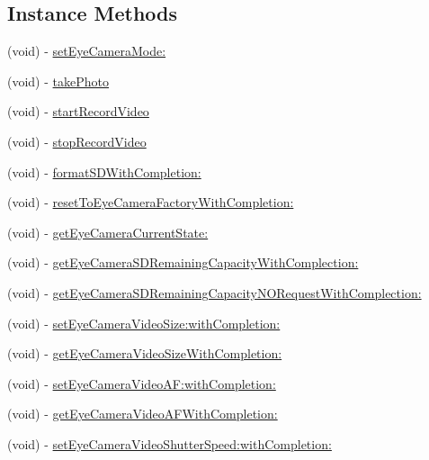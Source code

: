 \subsection*{Instance Methods}
\begin{DoxyCompactItemize}
\item 
(void) -\/ \hyperlink{interface_p_v_eye_camera_aeb9dbca0f5efc52162ffa13365040f8d}{set\+Eye\+Camera\+Mode\+:}
\item 
(void) -\/ \hyperlink{interface_p_v_eye_camera_aeb99a8e6bc9f5a0e7a183305cc39b7fb}{take\+Photo}
\item 
(void) -\/ \hyperlink{interface_p_v_eye_camera_a1fc31e8a6aab22625c780b1ecaff5e87}{start\+Record\+Video}
\item 
(void) -\/ \hyperlink{interface_p_v_eye_camera_a9b0113dbfb0790217f840d8c633e694e}{stop\+Record\+Video}
\item 
(void) -\/ \hyperlink{interface_p_v_eye_camera_aa944cc721867320c4c015eb7da0f8369}{format\+S\+D\+With\+Completion\+:}
\item 
(void) -\/ \hyperlink{interface_p_v_eye_camera_a6e9ae0dd101cddb8cca78c88bac7149b}{reset\+To\+Eye\+Camera\+Factory\+With\+Completion\+:}
\item 
(void) -\/ \hyperlink{interface_p_v_eye_camera_a7f2b3144f0e9aa5757d07d8df99a7998}{get\+Eye\+Camera\+Current\+State\+:}
\item 
(void) -\/ \hyperlink{interface_p_v_eye_camera_a9cac9e6fab67c4da6ad1f42571ab7002}{get\+Eye\+Camera\+S\+D\+Remaining\+Capacity\+With\+Complection\+:}
\item 
(void) -\/ \hyperlink{interface_p_v_eye_camera_a303f6825fa1f885bca11298989637eaf}{get\+Eye\+Camera\+S\+D\+Remaining\+Capacity\+N\+O\+Request\+With\+Complection\+:}
\item 
(void) -\/ \hyperlink{interface_p_v_eye_camera_abe2afddccc2b07d02cd6b2153b04d3a4}{set\+Eye\+Camera\+Video\+Size\+:with\+Completion\+:}
\item 
(void) -\/ \hyperlink{interface_p_v_eye_camera_ae56b03ae094f2b3b9f9639e67509e430}{get\+Eye\+Camera\+Video\+Size\+With\+Completion\+:}
\item 
(void) -\/ \hyperlink{interface_p_v_eye_camera_aac5592563aaba1046574f5fb1e596176}{set\+Eye\+Camera\+Video\+A\+F\+:with\+Completion\+:}
\item 
(void) -\/ \hyperlink{interface_p_v_eye_camera_a52c778cbe91e70ebe3f4fb4d4f18860a}{get\+Eye\+Camera\+Video\+A\+F\+With\+Completion\+:}
\item 
(void) -\/ \hyperlink{interface_p_v_eye_camera_a98ebfa406c90eba9ea6b130cf406c37b}{set\+Eye\+Camera\+Video\+Shutter\+Speed\+:with\+Completion\+:}

\end{DoxyCompactItemize}
